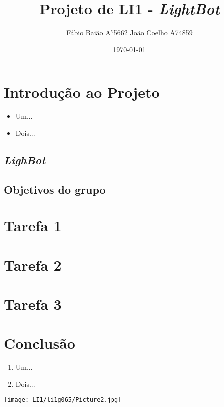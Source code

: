 \documentclass[12pt, a4paper]{article}
\title{Projeto de LI1 - \textit{LightBot}}
\author{Fábio Baião A75662 João Coelho A74859}
\date {\today}
\begin{document}
\maketitle

\tableofcontents

\section{Introdução ao Projeto}


\begin{itemize}
\item Um...
\item Dois...
\end{itemize}

\subsection{\textit{LighBot}}


\subsection{Objetivos do grupo}


\section{Tarefa 1}


\section{Tarefa 2}


\section{Tarefa 3}


\section{Conclusão}

\begin{enumerate}
    \item Um...
    \item Dois...
\end{enumerate}


\texttt{[image: LI1/li1g065/Picture2.jpg]}
\end{document}
